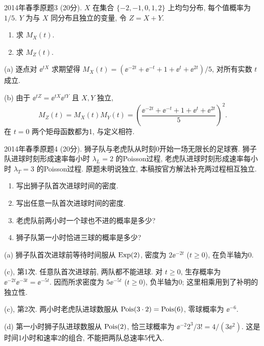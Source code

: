 \begin{exercise}\label{m2:2014s:q3}
2014年春季原题3 (20分). $X$ 在集合 $\{-2,-1,0,1,2\}$ 上均匀分布, 每个值概率为 $1/5$. $Y$ 为与 $X$ 同分布且独立的变量, 令 $Z=X+Y$.
\begin{enumerate}
\item[(a)]\label{m2:2014s:q3:a} 求 $M_X(t)$.
\item[(b)]\label{m2:2014s:q3:b} 求 $M_Z(t)$.
\end{enumerate}
\end{exercise}
\begin{solution}
(a) 逐点对 $\ee^{tX}$ 求期望得 $M_X(t)=(\ee^{-2t}+\ee^{-t}+1+\ee^t+\ee^{2t})/5$, 对所有实数 $t$ 成立.

(b) 由于 $\ee^{tZ}=\ee^{tX}\ee^{tY}$ 且 $X,Y$ 独立,
\[
M_Z(t)=M_X(t)M_Y(t)=\left(\frac{\ee^{-2t}+\ee^{-t}+1+\ee^t+\ee^{2t}}5\right)^2.
\]
在 $t=0$ 两个矩母函数都为1, 与定义相符.
\end{solution}

\begin{exercise}\label{m2:2014s:q4}
2014年春季原题4 (20分). 狮子队与老虎队从时刻0开始一场无限长的足球赛. 狮子队进球时刻形成速率每小时 $\lambda_L=2$ 的Poisson过程, 老虎队进球时刻形成速率每小时 $\lambda_T=3$ 的Poisson过程. 原题未明说独立, 本稿按官方解法补充两过程相互独立.
\begin{enumerate}
\item[(a)]\label{m2:2014s:q4:a} 写出狮子队首次进球时间的密度.
\item[(c), 第1次]\label{m2:2014s:q4:c1} 写出任意一队首次进球时间的密度.
\item[(c), 第2次]\label{m2:2014s:q4:c2} 老虎队前两小时一个球也不进的概率是多少?
\item[(d)]\label{m2:2014s:q4:d} 狮子队第一小时恰进三球的概率是多少?
\end{enumerate}
\end{exercise}
\begin{solution}
(a) 狮子队首次进球前等待时间服从 $\operatorname{Exp}(2)$, 密度为 $2\ee^{-2t}$ ($t\ge0$), 在负半轴为0.

(c), 第1次. 任意队首次进球前, 两队都不能进球. 对 $t\ge0$, 生存概率为 $\ee^{-2t}\ee^{-3t}=\ee^{-5t}$. 因而所求密度为 $5\ee^{-5t}$ ($t\ge0$), 负半轴为0; 这里相乘用到了补明的独立性.

(c), 第2次. 两小时老虎队进球数服从 $\operatorname{Pois}(3\cdot2)=\operatorname{Pois}(6)$, 零球概率为 $\ee^{-6}$.

(d) 第一小时狮子队进球数服从 $\operatorname{Pois}(2)$, 恰三球概率为 $\ee^{-2}2^3/3!=4/(3\ee^2)$. 这是时间1小时和速率2的组合, 不能把两队总速率5代入.
\end{solution}

